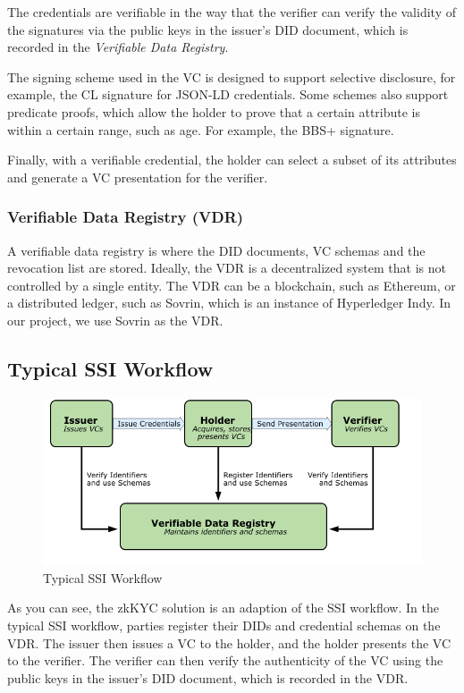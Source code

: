 \documentclass[
]{report}
\begin{document}
The credentials are verifiable in the way that the verifier can verify the
validity of the signatures via the public keys in the issuer's DID document,
which is recorded in the \emph{Verifiable Data Registry}.

The signing scheme used in the VC is designed to support selective disclosure,
for example, the CL signature for JSON-LD credentials. Some schemes also 
support predicate proofs, which allow the holder to prove that a certain
attribute is within a certain range, such as age. For example, the BBS+ 
signature.

Finally, with a verifiable credential, the holder can select a subset of its
attributes and generate a VC presentation for the verifier.

\subsubsection{Verifiable Data Registry (VDR)}
A verifiable data registry is where the DID documents, VC schemas and the
revocation list are stored. Ideally, the VDR is a decentralized system that
is not controlled by a single entity. The VDR can be a blockchain, such as
Ethereum, or a distributed ledger, such as Sovrin, which is an instance of
Hyperledger Indy. In our project, we use Sovrin as the VDR.

\subsection{Typical SSI Workflow}

\begin{figure}
\centering
\includegraphics[width=12cm]{ssi.png}
\caption{Typical SSI Workflow}
\end{figure}

As you can see, the zkKYC solution is an adaption of the SSI workflow.
In the typical SSI workflow, parties register their DIDs and
credential schemas on the VDR. The issuer then issues a VC to the holder,
and the holder presents the VC to the verifier. The verifier can then
verify the authenticity of the VC using the public keys in the issuer's
DID document, which is recorded in the VDR.
\end{document}
